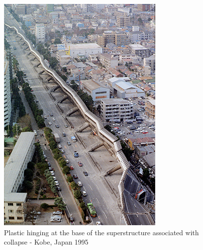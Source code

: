 \documentclass[12pt,a4paper]{report}
\begin{document}
\begin{figure}[!h]
	\centering
	\begin{minipage}[b]{0.4\textwidth}
		\includegraphics[width=\textwidth]{example1}
		\caption{Plastic hinging at the base of the superstructure associated with collapse - Kobe, Japan 1995 }
		\label{kobe}
	\end{minipage}
	\hfill
	\begin{minipage}[b]{0.4\textwidth}

\end{minipage}
\end{figure}
\end{document}
